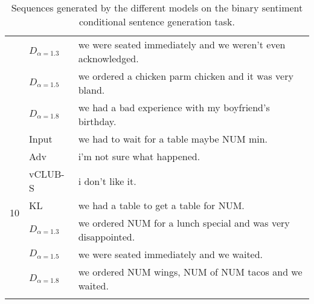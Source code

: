 \begin{longtable}[ht]{ll|l}
&$D_{\alpha=1.3}$  & we were seated immediately and we weren't even acknowledged. \\
&$D_{\alpha=1.5}$  & 	we ordered a chicken parm chicken and it was very bland. \\
&$D_{\alpha=1.8}$  & 	we had a bad experience with my boyfriend's birthday.\\ \hline
\multirow{7}{*}{10} &Input  & we had to wait for a table maybe NUM min.  \\\hline
&Adv  &  	i'm not sure what happened.	 \\
&vCLUB-S  & i don't like it.  \\
&KL  & 	we had a table to get a table for NUM.  \\
&$D_{\alpha=1.3}$  & 	we ordered NUM for a lunch special and was very disappointed.\\
&$D_{\alpha=1.5}$  &we were seated immediately and we waited. \\
&$D_{\alpha=1.8}$  & we ordered NUM wings, NUM of NUM tacos and we waited. \\ \hline\hline
\caption{Sequences generated by the different models on the binary sentiment conditional sentence generation task.}
\label{tab:example_sentences_cg}
\end{longtable}
\fi
\twocolumn
\iffalse
\subsubsection{Results on Conditional Sentence Generation}
\begin{figure*} \centering
\begin{subfigure}[t]{0.32\textwidth}
\texttt{[image: style\_sent/bleu\_sent\_False.pdf]}\vspace{-.3cm}
\caption{}\label{fig:bleu_st_cg}  
\end{subfigure} \begin{subfigure}[t]{0.32\textwidth}
\texttt{[image: style\_sent/accu\_sent\_False.pdf]}\vspace{-.3cm}
\caption{}\label{fig:accuracy_sentiment_cg} \end{subfigure} \begin{subfigure}[t]{0.32\textwidth}
        \texttt{[image: style\_sent/ppl\_sent\_False.pdf]}\vspace{-.3cm}
        \caption{}\label{fig:ppl_sentiment_cg}
    \end{subfigure}\vspace{-.3cm}
    \caption{Numerical experiments on conditional sentence generation. Results include BLEU (\autoref{fig:bleu_st_cg}), style transfer accuracy (\autoref{fig:accuracy_sentiment_cg}) and sentence fluency (\autoref{fig:ppl_sentiment_cg}).}\label{fig:conditionnal_sentence_sentiment}
\end{figure*}
\fi
